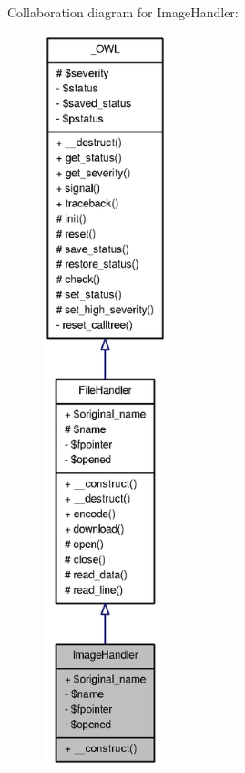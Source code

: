 Collaboration diagram for ImageHandler:\nopagebreak
\begin{figure}[H]
\begin{center}
\leavevmode
\includegraphics[height=600pt]{classImageHandler__coll__graph}
\end{center}
\end{figure}
